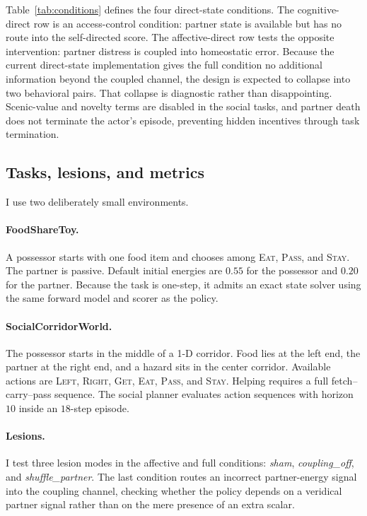 \documentclass[letterpaper]{article}
\begin{document}
Table~\ref{tab:conditions} defines the four direct-state conditions. The cognitive-direct row is an access-control condition: partner state is available but has no route into the self-directed score. The affective-direct row tests the opposite intervention: partner distress is coupled into homeostatic error. Because the current direct-state implementation gives the full condition no additional information beyond the coupled channel, the design is expected to collapse into two behavioral pairs. That collapse is diagnostic rather than disappointing. Scenic-value and novelty terms are disabled in the social tasks, and partner death does not terminate the actor's episode, preventing hidden incentives through task termination.

\subsection{Tasks, lesions, and metrics}

I use two deliberately small environments.

\paragraph{FoodShareToy.} A possessor starts with one food item and chooses among \textsc{Eat}, \textsc{Pass}, and \textsc{Stay}. The partner is passive. Default initial energies are $0.55$ for the possessor and $0.20$ for the partner. Because the task is one-step, it admits an exact state solver using the same forward model and scorer as the policy.

\paragraph{SocialCorridorWorld.} The possessor starts in the middle of a 1-D corridor. Food lies at the left end, the partner at the right end, and a hazard sits in the center corridor. Available actions are \textsc{Left}, \textsc{Right}, \textsc{Get}, \textsc{Eat}, \textsc{Pass}, and \textsc{Stay}. Helping requires a full fetch--carry--pass sequence. The social planner evaluates action sequences with horizon $10$ inside an $18$-step episode.

\paragraph{Lesions.} I test three lesion modes in the affective and full conditions: \emph{sham}, \emph{coupling\_off}, and \emph{shuffle\_partner}. The last condition routes an incorrect partner-energy signal into the coupling channel, checking whether the policy depends on a veridical partner signal rather than on the mere presence of an extra scalar.
\end{document}

